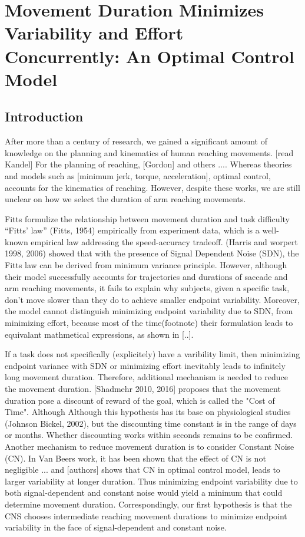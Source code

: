\chapter{Movement Duration Minimizes Variability and Effort Concurrently: An Optimal Control Model}
\label{cha:ocmd}

\section{Introduction}
After more than a century of research, we gained a significant amount of knowledge on the planning and kinematics of human reaching movements. [read Kandel] For the planning of reaching, [Gordon] and others .... Whereas theories and models such as [minimum jerk, torque, acceleration], optimal control, accounts for the kinematics of reaching. However, despite these works, we are still unclear on how we select the duration of arm reaching movements. 

Fitts formulize the relationship between movement duration and task difficulty  “Fitts’ law” (Fitts, 1954) empirically from experiment data, which is a well-known empirical law addressing the speed-accuracy tradeoff. (Harris and worpert 1998, 2006) showed that with the presence of Signal Dependent Noise (SDN), the Fitts law can be derived from minimum variance principle. However, although their model successfully accounts for trajectories and durations of saccade and arm reaching movements, it fails to explain why subjects, given a specific task, don't move slower than they do to achieve smaller endpoint variability. Moreover, the model cannot distinguish minimizing endpoint variability due to SDN, from minimizing effort, because most of the time(footnote) their formulation leads to equivalant mathmetical expressions, as shown in [..]. 

If a task does not specifically (explicitely) have a varibility limit, then minimizing endpoint variance with SDN or minimizing effort inevitably leads to infinitely long movement duration. Therefore, additional mechanism is needed to reduce the movement duration. [Shadmehr 2010, 2016] proposes that the movement duration pose a discount of reward of the goal, which is called the "Cost of Time". Although Although this hypothesis has its base on physiological studies (Johnson  Bickel, 2002), but the discounting time constant is in the range of days or months. Whether discounting works within seconds remains to be confirmed. Another mechanism to reduce movement duration is to consider Constant Noise (CN). In Van Beers work, it has been shown that the effect of CN is not negligible ... and [authors] shows that CN in optimal control model, leads to larger variability at longer duration. Thus minimizing endpoint variability due to both signal-dependent and constant noise would yield a minimum that could determine movement duration. Correspondingly, our first hypothesis is that the CNS chooses intermediate reaching movement durations to minimize endpoint variability in the face of signal-dependent and constant noise.

